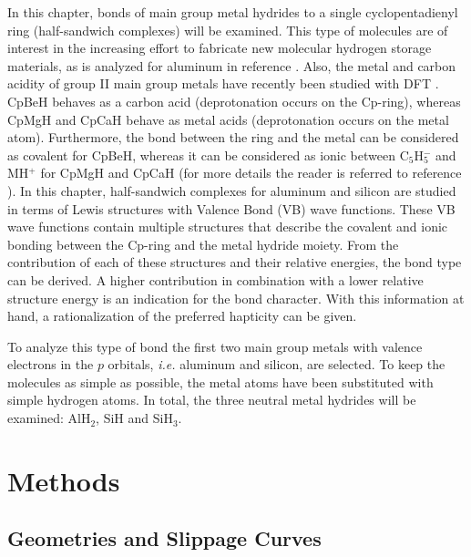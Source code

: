 In this chapter, bonds of main group metal hydrides to a single cyclopentadienyl ring (half-sandwich complexes) will be examined. This type of molecules are of interest in the increasing effort to fabricate new molecular hydrogen storage materials, as is analyzed for aluminum in reference \cite{himmel}. Also, the metal and carbon acidity of group II main group metals have recently been studied with DFT \cite{hurtado}. CpBeH behaves as a carbon acid (deprotonation occurs on the Cp-ring), whereas CpMgH and CpCaH behave as metal acids (deprotonation occurs on the metal atom). Furthermore, the bond between the ring and the metal can be considered as covalent for CpBeH, whereas it can be considered as ionic between C$_5$H$_5^{-}$ and MH$^{+}$ for CpMgH and CpCaH (for more details the reader is referred to reference \cite{hurtado}). In this chapter, half-sandwich complexes for aluminum and silicon are studied in terms of Lewis structures with Valence Bond (VB) wave functions. These VB wave functions contain multiple structures that describe the covalent and ionic bonding between the Cp-ring and the metal hydride moiety. From the contribution of each of these structures and their relative energies, the bond type can be derived. A higher contribution in combination with a lower relative structure energy is an indication for the bond character. With this information at hand, a rationalization of the preferred hapticity can be given. 

To analyze this type of bond the first two main group metals with valence electrons in the $p$ orbitals, \textit{i.e.} aluminum and silicon, are selected. To keep the molecules as simple as possible, the metal atoms have been substituted with simple hydrogen atoms. In total, the three neutral metal hydrides will be examined: AlH$_2$, SiH and SiH$_3$.

\section{Methods}

\subsection{\label{ch4.sec.geom}Geometries and Slippage Curves}

